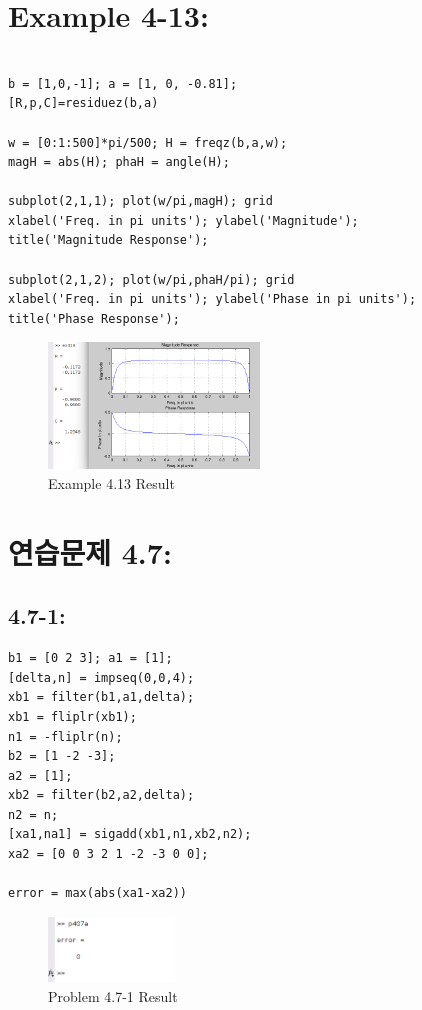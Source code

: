 \documentclass[11pt
  , a4paper
  , article
  , oneside
]{memoir}
\begin{document}
\chapter{Example 4-13:}
\begin{lstlisting}[style=termstyle]
%Example 4.13

b = [1,0,-1]; a = [1, 0, -0.81];
[R,p,C]=residuez(b,a)

w = [0:1:500]*pi/500; H = freqz(b,a,w);
magH = abs(H); phaH = angle(H);

subplot(2,1,1); plot(w/pi,magH); grid
xlabel('Freq. in pi units'); ylabel('Magnitude');
title('Magnitude Response');

subplot(2,1,2); plot(w/pi,phaH/pi); grid
xlabel('Freq. in pi units'); ylabel('Phase in pi units');
title('Phase Response');
\end{lstlisting}

\begin{figure}[h!]
	\centering
	\includegraphics[width=0.5\textwidth,height=0.3\textwidth]{./images/ex413.png}
	\caption{Example 4.13 Result}
	\label{fig:Example 4.13 Result}
\end{figure}

\clearpage

\chapter{연습문제 4.7: }
\section{4.7-1: }
\begin{lstlisting}[style=termstyle]
%Problem 4.7-1
b1 = [0 2 3]; a1 = [1]; 
[delta,n] = impseq(0,0,4);
xb1 = filter(b1,a1,delta); 
xb1 = fliplr(xb1); 
n1 = -fliplr(n);
b2 = [1 -2 -3]; 
a2 = [1]; 
xb2 = filter(b2,a2,delta); 
n2 = n;
[xa1,na1] = sigadd(xb1,n1,xb2,n2); 
xa2 = [0 0 3 2 1 -2 -3 0 0];

error = max(abs(xa1-xa2))
\end{lstlisting}

\begin{figure}[h!]
	\centering
	\includegraphics[width=0.3\textwidth,height=0.1\textwidth]{./images/p407a.png}
	\caption{Problem 4.7-1 Result}
	\label{fig:Problem 4.7-1 Result}
\end{figure}
\end{document}
